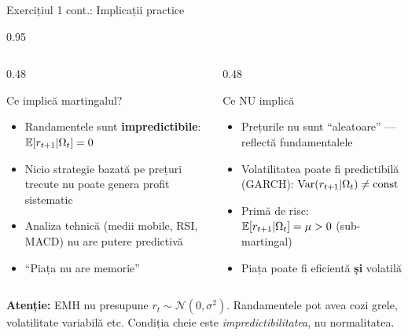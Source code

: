 \documentclass[9pt, aspectratio=169, t]{beamer}
\begin{document}
\begin{frame}{Exercițiul 1 cont.: Implicații practice}
    \begin{cminipage}{0.95\textwidth}
\begin{columns}[T]
\begin{column}{0.48\textwidth}
\begin{block}{Ce implică martingalul?}
\begin{itemize}\setlength{\itemsep}{0pt}
    \item Randamentele sunt \textbf{impredictibile}: $\mathbb{E}[r_{t+1} | \Omega_t] = 0$
    \item Nicio strategie bazată pe prețuri trecute nu poate genera profit sistematic
    \item Analiza tehnică (medii mobile, RSI, MACD) nu are putere predictivă
    \item ``Piața nu are memorie''
\end{itemize}
\end{block}
\end{column}
\begin{column}{0.48\textwidth}
\begin{block}{Ce NU implică}
\begin{itemize}\setlength{\itemsep}{0pt}
    \item Prețurile nu sunt ``aleatoare'' --- reflectă fundamentalele
    \item Volatilitatea poate fi predictibilă (GARCH): $\text{Var}(r_{t+1}|\Omega_t) \neq \text{const}$
    \item Primă de risc: $\mathbb{E}[r_{t+1}|\Omega_t] = \mu > 0$ (sub-martingal)
    \item Piața poate fi eficientă \textbf{și} volatilă
\end{itemize}
\end{block}
\end{column}
\end{columns}

\vspace{0.2cm}
\begin{alertblock}{}
    {\small \textbf{Atenție:} EMH nu presupune $r_t \sim \mathcal{N}(0, \sigma^2)$. Randamentele pot avea cozi grele, volatilitate variabilă etc. Condiția cheie este \textit{impredictibilitatea}, nu normalitatea.}
\end{alertblock}
    \end{cminipage}
\end{frame}
\end{document}
